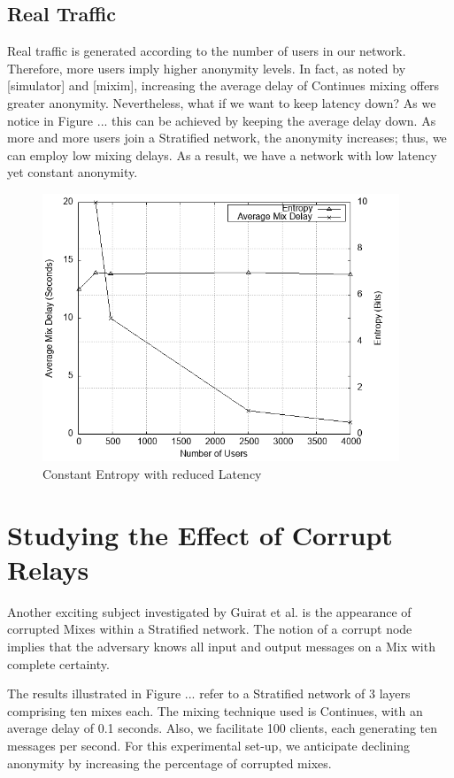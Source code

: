 \documentclass[logo,msc,cyber]{infthesis}   %
\begin{document}
\subsection{Real Traffic}

Real traffic is generated according to the number of users in our network.
Therefore, more users imply higher anonymity levels. In fact, as noted by
[simulator] and [mixim], increasing the average delay of Continues mixing offers
greater anonymity. Nevertheless, what if we want to keep latency down? As we
notice in Figure ... this can be achieved by keeping the average delay down. As
more and more users join a Stratified network, the anonymity increases; thus, we
can employ low mixing delays. As a result, we have a network with low latency
yet constant anonymity.

\begin{figure}[h!]
    \centering
    \includegraphics[height=8cm]{figures/simulator/5.png}
    \caption{Constant Entropy with reduced Latency}
    \label{fig:nym-stratified-low-latency-constant-anonymity}
 \end{figure}

\section{Studying the Effect of Corrupt Relays}

Another exciting subject investigated by Guirat et al. is the appearance of
corrupted Mixes within a Stratified network. The notion of a corrupt node
implies that the adversary knows all input and output messages on a Mix with
complete certainty. 

The results illustrated in Figure ... refer to a Stratified network of 3 layers
comprising ten mixes each. The mixing technique used is Continues, with an
average delay of 0.1 seconds. Also, we facilitate 100 clients, each generating
ten messages per second. For this experimental set-up, we anticipate declining
anonymity by increasing the percentage of corrupted mixes. 
\end{document}
